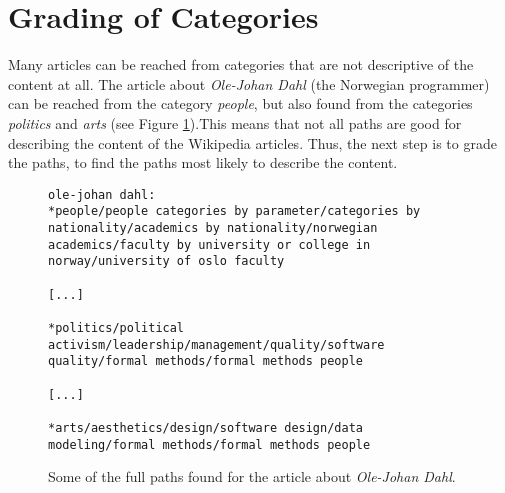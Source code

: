 \section{Grading of Categories}

Many articles can be reached from categories that are not descriptive of the content at all. The article about \emph{Ole-Johan Dahl} (the Norwegian programmer) can be reached from the category \emph{people}, but also found from the categories \emph{politics} and \emph{arts} (see Figure \ref{fig:olejohandahl_paths}).This means that not all paths are good for describing the content of the Wikipedia articles. Thus, the next step is to grade the paths, to find the paths most likely to describe the content.


\begin{figure}[h]
\centering
\begin{lstlisting}
ole-johan dahl:
*people/people categories by parameter/categories by nationality/academics by nationality/norwegian academics/faculty by university or college in norway/university of oslo faculty

[...]

*politics/political activism/leadership/management/quality/software quality/formal methods/formal methods people

[...]

*arts/aesthetics/design/software design/data modeling/formal methods/formal methods people

\end{lstlisting}
\caption[Example of variety in article paths]{Some of the full paths found for the article about \emph{Ole-Johan Dahl}.}
\label{fig:olejohandahl_paths}
\end{figure}

